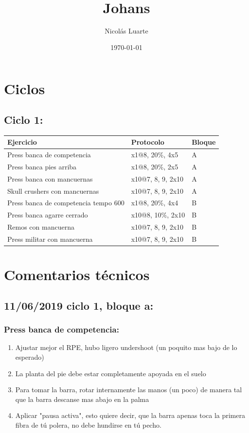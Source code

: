 \documentclass[11pt]{article}
\author{Nicolás Luarte}
\date{\today}
\title{Johans}
\begin{document}
\maketitle
\tableofcontents

\section{Ciclos}
\label{sec:org9916157}
\subsection{Ciclo 1:}
\label{sec:org7e09fb9}
\begin{center}
\begin{tabular}{lll}
\hline
Ejercicio & Protocolo & Bloque\\
\hline
Press banca de competencia & x1@8, 20\%, 4x5 & A\\
Press banca pies arriba & x1@8, 20\%, 2x5 & A\\
Press banca con mancuernas & x10@7, 8, 9, 2x10 & A\\
Skull crushers con mancuernas & x10@7, 8, 9, 2x10 & A\\
\hline
Press banca de competencia tempo 600 & x1@8, 20\%, 4x4 & B\\
Press banca agarre cerrado & x10@8, 10\%, 2x10 & B\\
Remos con mancuerna & x10@7, 8, 9, 2x10 & B\\
Press militar con mancuerna & x10@7, 8, 9, 2x10 & B\\
\hline
\end{tabular}
\end{center}
\section{Comentarios técnicos}
\label{sec:orgdc25dc5}
\subsection{11/06/2019 ciclo 1, bloque a:}
\label{sec:orgedde709}
\subsubsection{Press banca de competencia:}
\label{sec:org04d6d79}

\begin{enumerate}
\item Ajustar mejor el RPE, hubo ligero undershoot (un poquito mas bajo
de lo esperado)
\item La planta del pie debe estar completamente apoyada en el suelo
\item Para tomar la barra, rotar internamente las manos (un poco) de
manera tal que la barra descanse mas abajo en la palma
\item Aplicar "pausa activa", esto quiere decir, que la barra apenas toca
la primera fibra de tú polera, no debe hundirse en tú pecho.
\end{enumerate}
\end{document}
